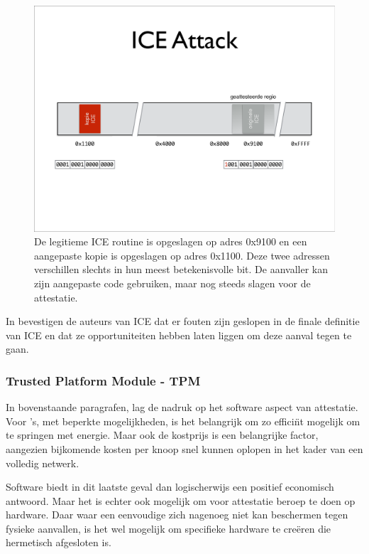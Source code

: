 \begin{figure}
  \centering
  \includegraphics[width=0.9\linewidth]{resources/attestation-ice-copy.pdf}
  \caption{De legitieme ICE routine is opgeslagen op adres 0x9100 en een
  aangepaste kopie is opgeslagen op adres 0x1100. Deze twee adressen
  verschillen slechts in hun meest betekenisvolle bit. De aanvaller kan zijn
  aangepaste code gebruiken, maar nog steeds slagen voor de attestatie.}
  \label{fig:attestation-ice-copy}
\end{figure}

In \cite{perrig2010refutation} bevestigen de auteurs van ICE dat er fouten zijn
geslopen in de finale definitie van ICE en dat ze opportuniteiten hebben laten
liggen om deze aanval tegen te gaan.

\subsubsection*{Trusted Platform Module - TPM}

In bovenstaande paragrafen, lag de nadruk op het software aspect van
attestatie. Voor \mcu's, met beperkte mogelijkheden, is het belangrijk om zo
effici\"nt mogelijk om te springen met energie. Maar ook de kostprijs is een
belangrijke factor, aangezien bijkomende kosten per knoop snel kunnen oplopen
in het kader van een volledig netwerk.

Software biedt in dit laatste geval dan logischerwijs een positief economisch
antwoord. Maar het is echter ook mogelijk om voor attestatie beroep te doen op
hardware. Daar waar een eenvoudige \mcu zich nagenoeg niet kan beschermen tegen
fysieke aanvallen, is het wel mogelijk om specifieke hardware te cre\"eren die
hermetisch afgesloten is.


